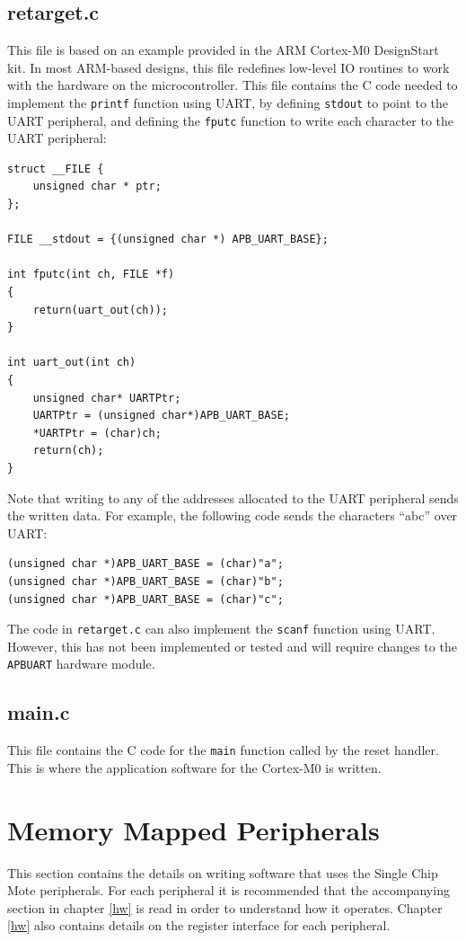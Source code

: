 \subsection{retarget.c}
This file is based on an example provided in the ARM Cortex-M0 DesignStart kit. In most ARM-based designs, this file redefines low-level IO routines to work with the hardware on the microcontroller. This file contains the C code needed to implement the \texttt{printf} function using UART, by defining \texttt{stdout} to point to the UART peripheral, and defining the \texttt{fputc} function to write each character to the UART peripheral:

\begin{lstlisting}
struct __FILE { 
    unsigned char * ptr;
};

FILE __stdout = {(unsigned char *) APB_UART_BASE};

int fputc(int ch, FILE *f)
{
    return(uart_out(ch));
}

int uart_out(int ch)
{
    unsigned char* UARTPtr;
    UARTPtr = (unsigned char*)APB_UART_BASE;
    *UARTPtr = (char)ch;
    return(ch);
}
\end{lstlisting}

Note that writing to any of the addresses allocated to the UART peripheral sends the written data. For example, the following code sends the characters ``abc'' over UART:

\begin{lstlisting}
(unsigned char *)APB_UART_BASE = (char)"a";
(unsigned char *)APB_UART_BASE = (char)"b";
(unsigned char *)APB_UART_BASE = (char)"c";
\end{lstlisting}

The code in \texttt{retarget.c} can also implement the \texttt{scanf} function using UART. However, this has not been implemented or tested and will require changes to the \texttt{APBUART} hardware module.

\subsection{main.c}
This file contains the C code for the \texttt{main} function called by the reset handler. This is where the application software for the Cortex-M0 is written.

\section{Memory Mapped Peripherals}
This section contains the details on writing software that uses the Single Chip Mote peripherals. For each peripheral it is recommended that the accompanying section in chapter \ref{hw} is read in order to understand how it operates. Chapter \ref{hw} also contains details on the register interface for each peripheral.


